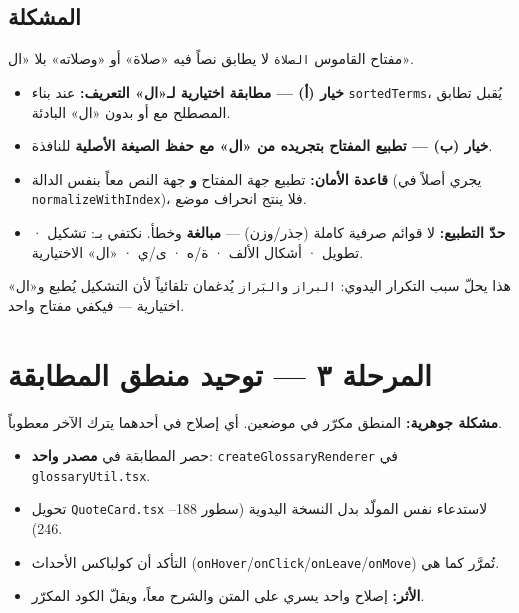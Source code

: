 \documentclass[11pt]{article}
\begin{document}
\subsection*{المشكلة}
مفتاح القاموس \texttt{الصلاة} لا يطابق نصاً فيه «صلاة» أو «وصلاته» بلا «ال».

\begin{itemize}
  \item \textbf{خيار (أ) — مطابقة اختيارية لـ«ال» التعريف:} عند بناء \texttt{sortedTerms}،
        يُقبل تطابق المصطلح مع أو بدون «ال» البادئة.
  \item \textbf{خيار (ب) — تطبيع المفتاح بتجريده من «ال» مع حفظ الصيغة الأصلية} للنافذة.
  \item \textbf{قاعدة الأمان:} تطبيع جهة المفتاح \textbf{و} جهة النص معاً بنفس الدالة
        (يجري أصلاً في \texttt{normalizeWithIndex})، فلا ينتج انحراف موضع.
  \item \textbf{حدّ التطبيع:} لا قوائم صرفية كاملة (جذر/وزن) — \textbf{مبالغة} وخطأ.
        نكتفي بـ: تشكيل · تطويل · أشكال الألف · ة/ه · ى/ي · «ال» الاختيارية.
\end{itemize}

\begin{notebox}
هذا يحلّ سبب التكرار اليدوي: \texttt{البراز} و\texttt{البَراز} يُدغمان تلقائياً لأن
التشكيل يُطبع و«ال» اختيارية — فيكفي مفتاح واحد.
\end{notebox}

\section{المرحلة ٣ — توحيد منطق المطابقة}

\begin{warnbox}
\textbf{مشكلة جوهرية:} المنطق مكرّر في موضعين. أي إصلاح في أحدهما يترك الآخر معطوباً.
\end{warnbox}

\begin{itemize}
  \item حصر المطابقة في \textbf{مصدر واحد}: \texttt{createGlossaryRenderer} في \texttt{glossaryUtil.tsx}.
  \item تحويل \texttt{QuoteCard.tsx} لاستدعاء نفس المولّد بدل النسخة اليدوية (سطور 188--246).
  \item التأكد أن كولباكس الأحداث (\texttt{onHover}/\texttt{onClick}/\texttt{onLeave}/\texttt{onMove}) تُمرَّر كما هي.
  \item \textbf{الأثر:} إصلاح واحد يسري على المتن والشرح معاً، ويقلّ الكود المكرّر.
\end{itemize}
\end{document}
